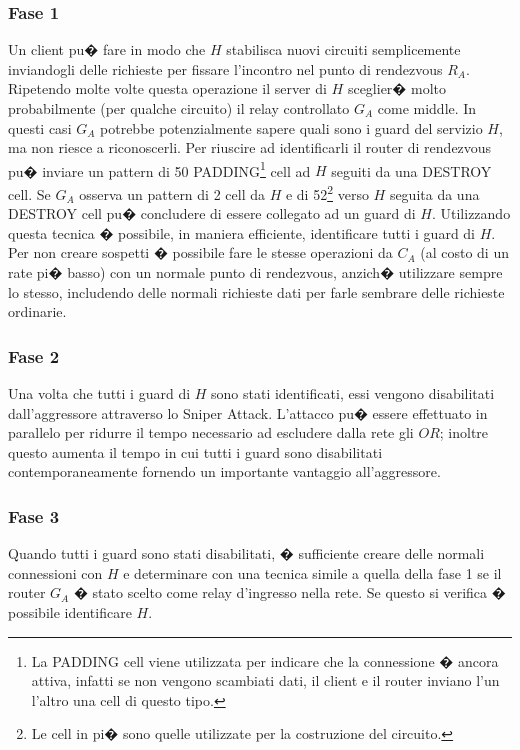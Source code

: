 \subsubsection{Fase 1}
Un client pu� fare in modo che $H$ stabilisca nuovi circuiti semplicemente inviandogli delle richieste per fissare l'incontro nel punto di rendezvous $R_{A}$. Ripetendo molte volte questa operazione il server di $H$ sceglier� molto probabilmente (per qualche circuito) il relay controllato $G_{A}$ come middle. In questi casi $G_{A}$ potrebbe potenzialmente sapere quali sono i guard del servizio $H$, ma non riesce a riconoscerli. Per riuscire ad identificarli il router di rendezvous pu� inviare un pattern di 50 {\ttfamily PADDING}\footnote{La {\ttfamily PADDING} cell viene utilizzata per indicare che la connessione � ancora attiva, infatti se non vengono scambiati dati, il client e il router inviano l'un l'altro una cell di questo tipo.} cell ad $H$ seguiti da una {\ttfamily DESTROY} cell. Se $G_{A}$ osserva un pattern di 2 cell da $H$ e di 52\footnote{Le cell in pi� sono quelle utilizzate per la costruzione del circuito.} verso $H$ seguita da una {\ttfamily DESTROY} cell pu� concludere di essere collegato ad un guard di $H$. Utilizzando questa tecnica � possibile, in maniera efficiente, identificare tutti i guard di $H$. Per non creare sospetti � possibile fare le stesse operazioni da $C_{A}$ (al costo di un rate pi� basso) con un normale punto di rendezvous, anzich� utilizzare sempre lo stesso, includendo delle normali richieste dati per farle sembrare delle richieste ordinarie. 

\subsubsection{Fase 2}
Una volta che tutti i guard di $H$ sono stati identificati, essi vengono disabilitati dall'aggressore attraverso lo Sniper Attack. L'attacco pu� essere effettuato in parallelo per ridurre il tempo necessario ad escludere dalla rete gli $OR$; inoltre questo aumenta il tempo in cui tutti i guard sono disabilitati contemporaneamente fornendo un importante vantaggio all'aggressore.

\subsubsection{Fase 3}
Quando tutti i guard sono stati disabilitati, � sufficiente creare delle normali connessioni con $H$ e determinare con una tecnica simile a quella della fase 1 se il router $G_{A}$ � stato scelto come relay d'ingresso nella rete. Se questo si verifica � possibile identificare $H$. 

